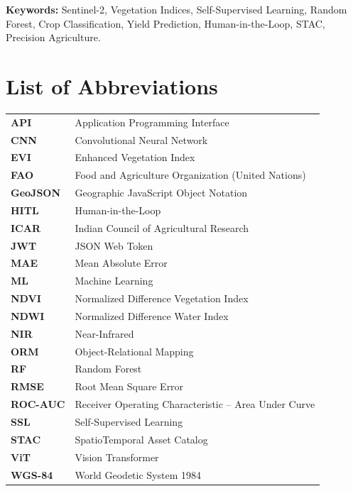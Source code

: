 \documentclass[12pt,a4paper,oneside]{report}
\begin{document}
\vspace{0.5cm}
\noindent\textbf{Keywords:} Sentinel-2, Vegetation Indices, Self-Supervised Learning,
Random Forest, Crop Classification, Yield Prediction, Human-in-the-Loop, STAC,
Precision Agriculture.

\tableofcontents
\listoffigures
\listoftables

\chapter*{List of Abbreviations}
\begin{tabular}{ll}
\textbf{API}   & Application Programming Interface \\
\textbf{CNN}   & Convolutional Neural Network \\
\textbf{EVI}   & Enhanced Vegetation Index \\
\textbf{FAO}   & Food and Agriculture Organization (United Nations) \\
\textbf{GeoJSON} & Geographic JavaScript Object Notation \\
\textbf{HITL}  & Human-in-the-Loop \\
\textbf{ICAR}  & Indian Council of Agricultural Research \\
\textbf{JWT}   & JSON Web Token \\
\textbf{MAE}   & Mean Absolute Error \\
\textbf{ML}    & Machine Learning \\
\textbf{NDVI}  & Normalized Difference Vegetation Index \\
\textbf{NDWI}  & Normalized Difference Water Index \\
\textbf{NIR}   & Near-Infrared \\
\textbf{ORM}   & Object-Relational Mapping \\
\textbf{RF}    & Random Forest \\
\textbf{RMSE}  & Root Mean Square Error \\
\textbf{ROC-AUC} & Receiver Operating Characteristic – Area Under Curve \\
\textbf{SSL}   & Self-Supervised Learning \\
\textbf{STAC}  & SpatioTemporal Asset Catalog \\
\textbf{ViT}   & Vision Transformer \\
\textbf{WGS-84} & World Geodetic System 1984 \\
\end{tabular}
\end{document}
